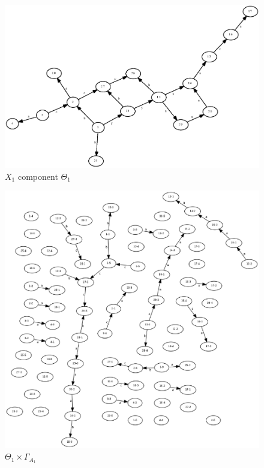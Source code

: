 \documentclass[a4paper,12pt]{article}
\newcommand{\G}{\Gamma }
\numberwithin{equation}{section}
\numberwithin{figure}{section}
\begin{document}
\begin{figure}
\begin{center}
\includegraphics[scale=0.5, bb=0 0 680 480]{python/ex_K_f1.eps}
\caption{$X_1$ component $\Theta_1$}
\label{fig:K_f1}
\end{center}
\end{figure}

\begin{figure}
\begin{center}
\includegraphics[scale=0.8, bb=0 0 500 480]{python/ex_K_f1-x-g.eps}
\caption{$\Theta_1\times \G_{A_1}$}
\label{fig:K_f1-x-g}
\end{center}
\end{figure}
\end{document}
